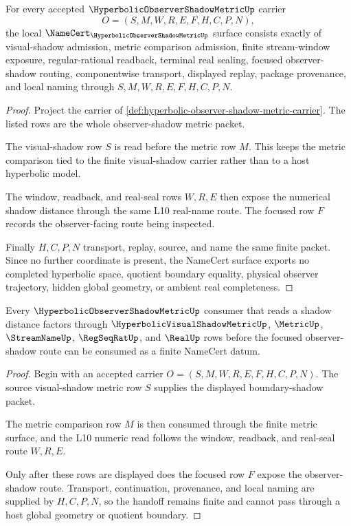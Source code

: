 \begin{theorem}
\label{thm:hyperbolic-observer-shadow-metric-namecert-obligations}
For every accepted $\HyperbolicObserverShadowMetricUp$ carrier
$$
O=(S,M,W,R,E,F,H,C,P,N),
$$
the local $\NameCert_{\HyperbolicObserverShadowMetricUp}$ surface consists exactly of visual-shadow admission, metric comparison admission, finite stream-window exposure, regular-rational readback, terminal real sealing, focused observer-shadow routing, componentwise transport, displayed replay, package provenance, and local naming through $S,M,W,R,E,F,H,C,P,N$.
\end{theorem}
\begin{proof}
Project the carrier of \autoref{def:hyperbolic-observer-shadow-metric-carrier}. The listed rows are the whole observer-shadow metric packet.

The visual-shadow row $S$ is read before the metric row $M$. This keeps the metric comparison tied to the finite visual-shadow carrier rather than to a host hyperbolic model.

The window, readback, and real-seal rows $W,R,E$ then expose the numerical shadow distance through the same L10 real-name route. The focused row $F$ records the observer-facing route being inspected.

Finally $H,C,P,N$ transport, replay, source, and name the same finite packet. Since no further coordinate is present, the NameCert surface exports no completed hyperbolic space, quotient boundary equality, physical observer trajectory, hidden global geometry, or ambient real completeness.
\end{proof}

\begin{theorem}
\label{thm:hyperbolic-observer-shadow-l10-handoff}
Every $\HyperbolicObserverShadowMetricUp$ consumer that reads a shadow distance factors through $\HyperbolicVisualShadowMetricUp$, $\MetricUp$, $\StreamNameUp$, $\RegSeqRatUp$, and $\RealUp$ rows before the focused observer-shadow route can be consumed as a finite NameCert datum.
\end{theorem}
\begin{proof}
Begin with an accepted carrier $O=(S,M,W,R,E,F,H,C,P,N)$. The source visual-shadow metric row $S$ supplies the displayed boundary-shadow packet.

The metric comparison row $M$ is then consumed through the finite metric surface, and the L10 numeric read follows the window, readback, and real-seal route $W,R,E$.

Only after these rows are displayed does the focused row $F$ expose the observer-shadow route. Transport, continuation, provenance, and local naming are supplied by $H,C,P,N$, so the handoff remains finite and cannot pass through a host global geometry or quotient boundary.
\end{proof}


